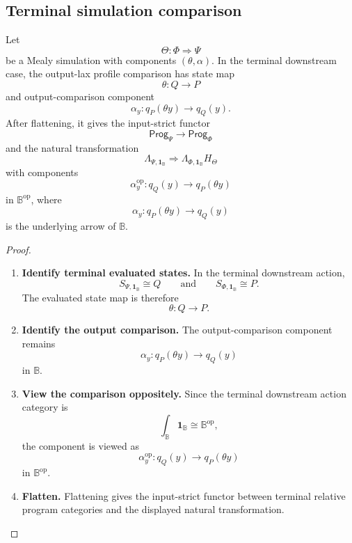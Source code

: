 \subsection{Terminal simulation comparison}
\label{subsec:poly-relative-example-terminal-simulation}

\begin{proposition}
\label{prop:poly-relative-terminal-simulation-comparison}
Let
\[
\Theta:\Phi\Rightarrow\Psi
\]
be a Mealy simulation with components \((\theta,\alpha)\).  In the terminal
downstream case, the output-lax profile comparison has state map
\[
\theta:Q\to P
\]
and output-comparison component
\[
\alpha_y:q_P(\theta y)\to q_Q(y).
\]
After flattening, it gives the input-strict functor
\[
\mathsf{Prog}_\Psi\to\mathsf{Prog}_\Phi
\]
and the natural transformation
\[
\Lambda_{\Psi,\mathbf 1_{\mathbb B}}
\Rightarrow
\Lambda_{\Phi,\mathbf 1_{\mathbb B}}H_\Theta
\]
with components
\[
\alpha_y^{\mathrm{op}}:
q_Q(y)\longrightarrow q_P(\theta y)
\]
in \(\mathbb B^{\mathrm{op}}\), where
\[
\alpha_y:q_P(\theta y)\to q_Q(y)
\]
is the underlying arrow of \(\mathbb B\).
\end{proposition}

\begin{proof}
\leavevmode
\begin{enumerate}
\item \textbf{Identify terminal evaluated states.}
In the terminal downstream action,
\[
S_{\Psi,\mathbf 1_{\mathbb B}}\cong Q
\qquad\text{and}\qquad
S_{\Phi,\mathbf 1_{\mathbb B}}\cong P.
\]
The evaluated state map is therefore
\[
\theta:Q\to P.
\]

\item \textbf{Identify the output comparison.}
The output-comparison component remains
\[
\alpha_y:q_P(\theta y)\to q_Q(y)
\]
in \(\mathbb B\).

\item \textbf{View the comparison oppositely.}
Since the terminal downstream action category is
\[
\int_{\mathbb B}\mathbf 1_{\mathbb B}\cong\mathbb B^{\mathrm{op}},
\]
the component is viewed as
\[
\alpha_y^{\mathrm{op}}:
q_Q(y)\to q_P(\theta y)
\]
in \(\mathbb B^{\mathrm{op}}\).

\item \textbf{Flatten.}
Flattening gives the input-strict functor between terminal relative program
categories and the displayed natural transformation.
\end{enumerate}
\end{proof}

